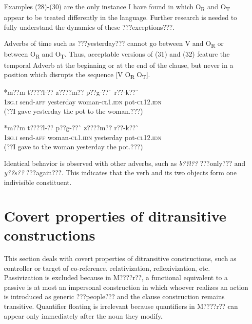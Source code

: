 \documentclass[output=paper]{langsci/langscibook}
\begin{document}
Examples (28){}-(30) are the only instance I have found in which O\textsubscript{R} and O\textsubscript{T} appear to be treated differently in the language. Further research is needed to fully understand the dynamics of these ???exceptions???.


Adverbs of time such as ???yesterday??? cannot go between V and O\textsubscript{R} or between O\textsubscript{R} and O\textsubscript{T}. Thus, acceptable versions of (31) and (32) feature the temporal Adverb at the beginning or at the end of the clause, but never in a position which disrupts the sequence [V O\textsubscript{R} O\textsubscript{T}].


\ea \gll 
\label{bkm:Ref424317802}*m??m    t????l-??    z????m??    p??g-??\`{ }      r??-k??\`{ }
\\
%
\textsc{1sg.i  }    send-\textsc{aff}  yesterday  woman-\textsc{cl1.idn}  pot-\textsc{cl12.idn}
\\\glt
(??I gave yesterday the pot to the woman.???)
\z


\ea \gll 
\label{bkm:Ref424317812}*m??m    t????l-??    p??g-??\`{ }      z????m??    r??-k??\`{ }
\\
%
\textsc{1sg.i  }    send-\textsc{aff}  woman\textsc{{}-cl1.idn}  yesterday  pot-\textsc{cl12.idn}
\\\glt
(??I gave to the woman yesterday the pot.???)
\z

Identical behavior is observed with other adverbs, such as \textit{b??l??} ???only??? and \textit{y??s??} ???again???. This indicates that the verb and its two objects form one indivisible constituent.

\section{Covert properties of ditransitive constructions }

This section deals with covert properties of ditransitive constructions, such as controller or target of co-reference, relativization, reflexivization, etc. Passivization is excluded because in M????r??, a functional equivalent to a passive is at most an impersonal construction in which whoever realizes an action is introduced as generic ???people??? and the clause construction remains transitive. Quantifier floating is irrelevant because quantifiers in M????r?? can appear only immediately after the noun they modify. 
\end{document}
